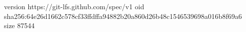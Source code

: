 version https://git-lfs.github.com/spec/v1
oid sha256:64e26d1662c578cf33ffdffa94882b20a860d26b48c1546539698a016b8f69a6
size 87544
